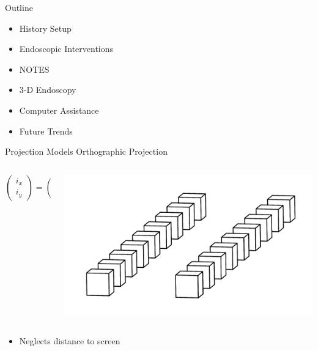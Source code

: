 \begin{frame}{Outline}
	\begin{itemize}
		\item History
		      \bolditem{} Setup
		\item Endoscopic Interventions
		\item NOTES
		\item 3-D Endoscopy
		\item Computer Assistance
		\item Future Trends
	\end{itemize}
\end{frame}

\begin{frame}[t]{Projection Models}
	Orthographic Projection


	\begin{columns}[c, onlytextwidth]
		\begin{column}{0.5\textwidth}
			\vspace{1.5cm}
			$$\left(\begin{array}{c}i_x\\i_y\end{array}\right) = \left(\begin{array}{ccc}1 &0 &0\\ 0&1&0\end{array}\right) \left(\begin{array}{c}x\\y\\z\end{array}\right)$$
			\vspace{1.5cm}
		\end{column}\begin{column}{0.5\textwidth}
			\begin{center}
				\includegraphics[width=1.1\textwidth]{images/orthographic.png}
			\end{center}
		\end{column}
	\end{columns}
	\begin{itemize}
		\item Neglects distance to screen
	\end{itemize}
\end{frame}


